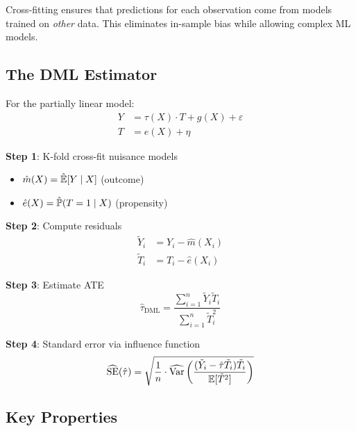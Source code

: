 \begin{insight}
Cross-fitting ensures that predictions for each observation come from models trained on \emph{other} data. This eliminates in-sample bias while allowing complex ML models.
\end{insight}

\subsection{The DML Estimator}

\begin{definition}
\label{def:dml}

For the partially linear model:
\begin{align}
Y &= \tau(X) \cdot T + g(X) + \varepsilon \\
T &= e(X) + \eta
\end{align}

\textbf{Step 1}: K-fold cross-fit nuisance models
\begin{itemize}
    \item $\hat{m}(X) = \hat{\mathbb{E}}[Y \mid X]$ (outcome)
    \item $\hat{e}(X) = \hat{\mathbb{P}}(T=1 \mid X)$ (propensity)
\end{itemize}

\textbf{Step 2}: Compute residuals
\begin{align}
\tilde{Y}_i &= Y_i - \hat{m}(X_i) \\
\tilde{T}_i &= T_i - \hat{e}(X_i)
\end{align}

\textbf{Step 3}: Estimate ATE
\begin{equation}
\hat{\tau}_{\text{DML}} = \frac{\sum_{i=1}^{n} \tilde{Y}_i \tilde{T}_i}{\sum_{i=1}^{n} \tilde{T}_i^2}
\end{equation}

\textbf{Step 4}: Standard error via influence function
\begin{equation}
\widehat{\text{SE}}(\hat{\tau}) = \sqrt{\frac{1}{n} \cdot \widehat{\mathrm{Var}}\left( \frac{(\tilde{Y}_i - \hat{\tau}\tilde{T}_i) \tilde{T}_i}{\mathbb{E}[\tilde{T}^2]} \right)}
\end{equation}
\end{definition}

\subsection{Key Properties}

